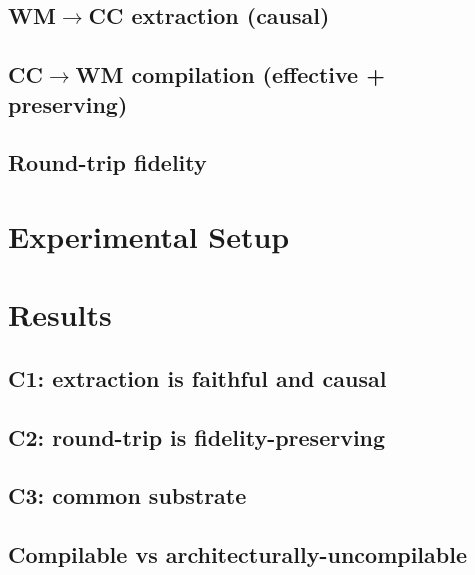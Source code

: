 \documentclass[10pt]{article}
\begin{document}
\subsection{WM$\to$CC extraction (causal)}
\subsection{CC$\to$WM compilation (effective + preserving)}
\subsection{Round-trip fidelity}

\section{Experimental Setup}

\section{Results}
\subsection{C1: extraction is faithful and causal}
\subsection{C2: round-trip is fidelity-preserving}
\subsection{C3: common substrate}
\subsection{Compilable vs architecturally-uncompilable}
\end{document}
